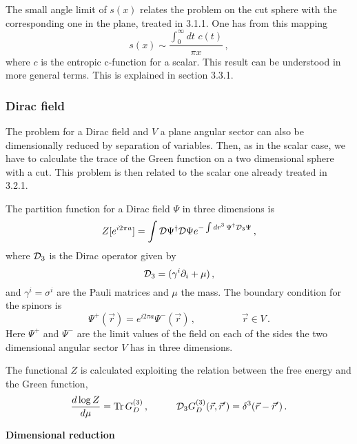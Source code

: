 \documentclass[a4paper]{article}
\begin{document}
The small angle limit of $s(x)$ relates the problem on the cut sphere with the corresponding one in the plane, treated in 3.1.1. One has from this mapping 
\begin{equation}
s(x)\sim\frac{\int_0^\infty dt\,\,c(t)}{\pi x}\,,\label{angulochico}
\end{equation}
 where $c$ is the entropic c-function for a scalar. This result can be understood in more general terms. This is explained in section 3.3.1.
\subsubsection{Dirac field}
The problem for a Dirac field and $V$ a plane angular sector can also be dimensionally reduced by separation of variables. Then, as in the scalar case, we have to calculate the trace of the Green function on a two dimensional sphere with a cut. This problem is then related to the scalar one already treated in 3.2.1. 

 The partition function for a Dirac field  $\Psi$ in three  dimensions is  
\begin{equation}
Z[e^{i 2 \pi a}]=\int {\cal D}\Psi^\dagger {\cal D}\Psi e^{-\int dr^3 \,\Psi^\dagger  {\cal D}_3 \Psi}\,,\label{eee}
\end{equation}
where ${\cal D}_3$ is the Dirac operator given by
\begin{equation}
{\cal D}_3=(\gamma^{i}\partial_i+\mu)\,,
\end{equation}
 and $\gamma^{i}=\sigma^{i}$ are the Pauli matrices and $\mu$ the mass. The boundary condition for the spinors is 
 \begin{equation}
\Psi^+(\vec{r})=e^{i 2\pi a} \Psi^-(\vec{r})\,,\hspace{2cm} \vec{r}\in V\,.\label{bounj}
\end{equation}
Here $\Psi^+$ and $\Psi^-$ are the limit values of the field on each of the sides the two dimensional angular sector $V$ has in three dimensions. 

The functional $Z$ is calculated exploiting the relation between the free energy and the Green function, 
\begin{equation}
\frac{d\log Z}{d\mu}=\textrm{Tr} \, G_D^{(3)}\,,\hspace{1cm}{\cal D}_3 G_D^{(3)}(\vec{r},\vec{r}^\prime) =\delta^3(\vec{r}-\vec{r}^\prime)\,.\label{chiri}
\end{equation}

\smallskip 

\noindent\textbf{Dimensional reduction}
\end{document}
